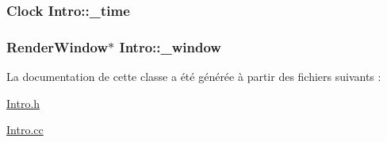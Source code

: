 \label{classIntro_afb88102685cacb8b825729533b3ad092}
\hypertarget{classIntro_af07ea5ea2a5ca224b580a089050cf5d8}{
\subsubsection[{\_\-time}]{\setlength{\rightskip}{0pt plus 5cm}Clock {\bf Intro::\_\-time}}}
\label{classIntro_af07ea5ea2a5ca224b580a089050cf5d8}
\hypertarget{classIntro_ad6c450761f6e94f2c792fa7f3c94f727}{
\subsubsection[{\_\-window}]{\setlength{\rightskip}{0pt plus 5cm}RenderWindow$\ast$ {\bf Intro::\_\-window}}}
\label{classIntro_ad6c450761f6e94f2c792fa7f3c94f727}


La documentation de cette classe a été générée à partir des fichiers suivants :\begin{DoxyCompactItemize}
\item 
\hyperlink{Intro_8h}{Intro.h}\item 
\hyperlink{Intro_8cc}{Intro.cc}\end{DoxyCompactItemize}
